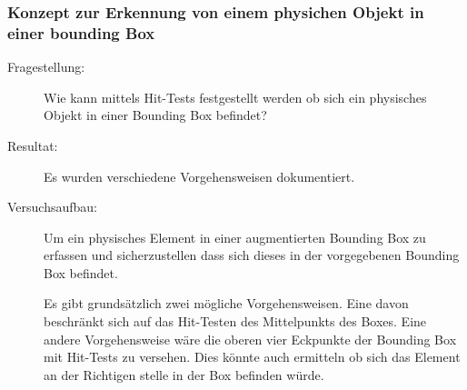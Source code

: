 \subsubsection{Konzept zur Erkennung von einem physichen Objekt in einer bounding Box}\label{subsub:prot-boundingbox}
\begin{description}
    \item[Fragestellung:] Wie kann mittels Hit-Tests festgestellt werden ob sich ein physisches Objekt in einer Bounding Box befindet?
	\item[Resultat:] Es wurden verschiedene Vorgehensweisen dokumentiert. 
    \item[Versuchsaufbau:] Um ein physisches Element in einer augmentierten Bounding Box zu erfassen und sicherzustellen dass sich dieses in der vorgegebenen Bounding Box befindet. 

    Es gibt grundsätzlich zwei mögliche Vorgehensweisen. Eine davon beschränkt sich auf das Hit-Testen des Mittelpunkts des Boxes. Eine andere Vorgehensweise wäre die oberen vier Eckpunkte der Bounding Box mit Hit-Tests zu versehen. Dies könnte auch ermitteln ob sich das Element an der Richtigen stelle in der Box befinden würde.


\end{description}

